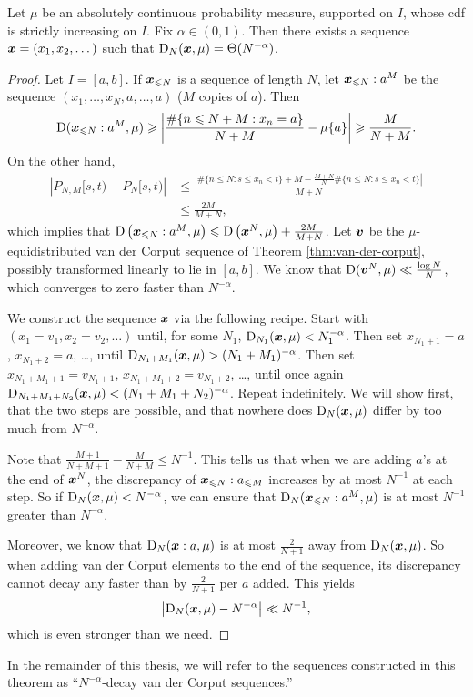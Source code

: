 \begin{theorem}\label{thm:discrepancy-arbitrary}
Let $\mu$ be an absolutely continuous probability measure, supported on $I$, 
whose cdf is strictly increasing on $I$. Fix $\alpha\in (0,1)$. Then there 
exists a sequence ${\boldsymbol x}=(x_1,x_2,\dots)$ such that 
$\operatorname{D}_N({\boldsymbol x},\mu) = \Theta(N^{-\alpha})$. 
\end{theorem}
\begin{proof}
Let $I = [a,b]$. If ${\boldsymbol x}_{\leqslant N}$ is a sequence of length $N$, let 
${\boldsymbol x}_{\leqslant N}:a^M$ be the sequence $(x_1,\dots,x_N,a,\dots,a)$ ($M$ copies 
of $a$). Then 
\[
	\operatorname{D}({\boldsymbol x}_{\leqslant N}:a^M,\mu)
		\geqslant \left| \frac{\#\{ n\leqslant N+M : x_n = a\}}{N+M} - \mu\{a\}\right| 
		\geqslant \frac{M}{N+M} .
\]
On the other hand, 
\begin{align*}
	\left| P_{N,M}[s,t) - P_N[s,t)\right| 
		&\leqslant \frac{\left|\#\{n\leqslant N : s\leqslant x_n< t\} + M - \frac{M+N}{N}\#\{n\leqslant N : s\leqslant x_n < t\}\right|}{M+N} \\
		&\leqslant \frac{2M}{M+N} ,
\end{align*}
which implies that 
$\operatorname{D}\left({\boldsymbol x}_{\leqslant N}:a^M,\mu\right) \leqslant \operatorname{D}\left({\boldsymbol x}^N,\mu\right) + \frac{2 M}{M+N}$. 
Let ${\boldsymbol v}$ be the $\mu$-equidistributed van der Corput sequence of 
Theorem \ref{thm:van-der-corput}, possibly transformed linearly to lie in 
$[a,b]$. We know that $\operatorname{D}({\boldsymbol v}^N, \mu) \ll \frac{\log N}{N}$, which converges 
to zero faster than $N^{-\alpha}$. 

We construct the sequence ${\boldsymbol x}$ via the following recipe. Start with 
$(x_1 = v_1,x_2 = v_2,\dots)$ until, for some $N_1$, 
$\operatorname{D}_{N_1}({\boldsymbol x},\mu) < N_1^{-\alpha}$. Then set $x_{N_1+1} = a$, 
$x_{N_1+2} = a$, \dots, until 
$\operatorname{D}_{N_1+M_1}({\boldsymbol x},\mu) > (N_1+M_1)^{-\alpha}$. Then set 
$x_{N_1+M_1+1} = v_{N_1+1}$, $x_{N_1+M_1+2} = v_{N_1+2}$, \dots, 
until once again 
$\operatorname{D}_{N_1+M_1+N_2}({\boldsymbol x},\mu) < (N_1+M_1+N_2)^{-\alpha}$. Repeat 
indefinitely. We will show first, that the two steps are possible, and that 
nowhere does $\operatorname{D}_N({\boldsymbol x},\mu)$ differ by too much from $N^{-\alpha}$. 

Note that $\frac{M+1}{N+M+1} - \frac{M}{N+M} \leqslant N^{-1}$. This tells 
us that when we are adding $a$'s at the end of ${\boldsymbol x}^N$, the discrepancy of 
${\boldsymbol x}_{\leqslant N}:a_{\leqslant M}$ increases by at most $N^{-1}$ at each 
step. So if $\operatorname{D}_N({\boldsymbol x},\mu) < N^{-\alpha}$, we can ensure that 
$\operatorname{D}_N({\boldsymbol x}_{\leqslant N}:a^M,\mu)$ is at most $N^{-1}$ greater than 
$N^{-\alpha}$. 

Moreover, we know that $\operatorname{D}_N({\boldsymbol x}:a,\mu)$ is at most 
$\frac{2}{N+1}$ away from $\operatorname{D}_N({\boldsymbol x},\mu)$. So when adding van der 
Corput elements to the end of the sequence, its discrepancy cannot decay any 
faster than by $\frac{2}{N+1}$ per $a$ added. This yields 
\[
	\left|\operatorname{D}_N({\boldsymbol x},\mu) - N^{-\alpha}\right| \ll N^{-1} , 
\]
which is even stronger than we need.
\end{proof}

In the remainder of this thesis, we will refer to the sequences constructed in 
this theorem as ``$N^{-\alpha}$-decay van der Corput sequences.''

